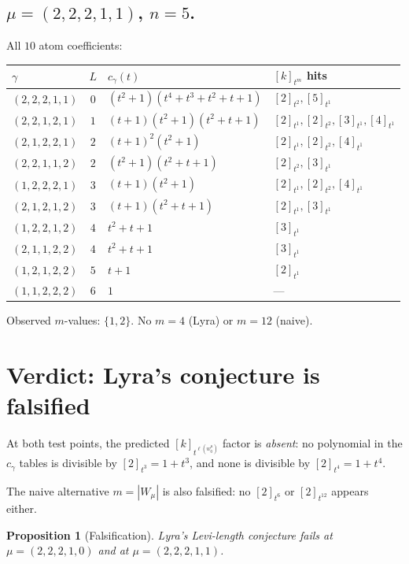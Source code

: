 \documentclass[11pt,letterpaper]{amsart}
\newtheorem{proposition}[theorem]{Proposition}
\theoremstyle{definition}
\theoremstyle{remark}
\begin{document}
\subsection{$\mu = (2,2,2,1,1)$, $n = 5$.}

All $10$ atom coefficients:
\begin{center}\small
\begin{tabular}{lcll}
$\gamma$ & $L$ & $c_\gamma(t)$ & $[k]_{t^m}$ hits \\ \hline
$(2,2,2,1,1)$ & $0$ & $(t^2+1)(t^4+t^3+t^2+t+1)$ & $[2]_{t^2}, [5]_{t^1}$ \\
$(2,2,1,2,1)$ & $1$ & $(t+1)(t^2+1)(t^2+t+1)$ & $[2]_{t^1}, [2]_{t^2}, [3]_{t^1}, [4]_{t^1}$ \\
$(2,1,2,2,1)$ & $2$ & $(t+1)^2(t^2+1)$ & $[2]_{t^1}, [2]_{t^2}, [4]_{t^1}$ \\
$(2,2,1,1,2)$ & $2$ & $(t^2+1)(t^2+t+1)$ & $[2]_{t^2}, [3]_{t^1}$ \\
$(1,2,2,2,1)$ & $3$ & $(t+1)(t^2+1)$ & $[2]_{t^1}, [2]_{t^2}, [4]_{t^1}$ \\
$(2,1,2,1,2)$ & $3$ & $(t+1)(t^2+t+1)$ & $[2]_{t^1}, [3]_{t^1}$ \\
$(1,2,2,1,2)$ & $4$ & $t^2+t+1$ & $[3]_{t^1}$ \\
$(2,1,1,2,2)$ & $4$ & $t^2+t+1$ & $[3]_{t^1}$ \\
$(1,2,1,2,2)$ & $5$ & $t+1$ & $[2]_{t^1}$ \\
$(1,1,2,2,2)$ & $6$ & $1$ & --- \\
\end{tabular}
\end{center}

Observed $m$-values: $\{1, 2\}$. No $m = 4$ (Lyra) or $m = 12$ (naive).

\section{Verdict: Lyra's conjecture is falsified}

At both test points, the predicted $[k]_{t^{\ell(w_0^\mu)}}$ factor is
\emph{absent}: no polynomial in the $c_\gamma$ tables is divisible by
$[2]_{t^3} = 1 + t^3$, and none is divisible by $[2]_{t^4} = 1 + t^4$.

The naive alternative $m = |W_\mu|$ is also falsified: no $[2]_{t^6}$ or
$[2]_{t^{12}}$ appears either.

\begin{proposition}[Falsification]
\label{prop:false}
Lyra's Levi-length conjecture fails at $\mu = (2,2,2,1,0)$ and at
$\mu = (2,2,2,1,1)$.
\end{proposition}
\end{document}
